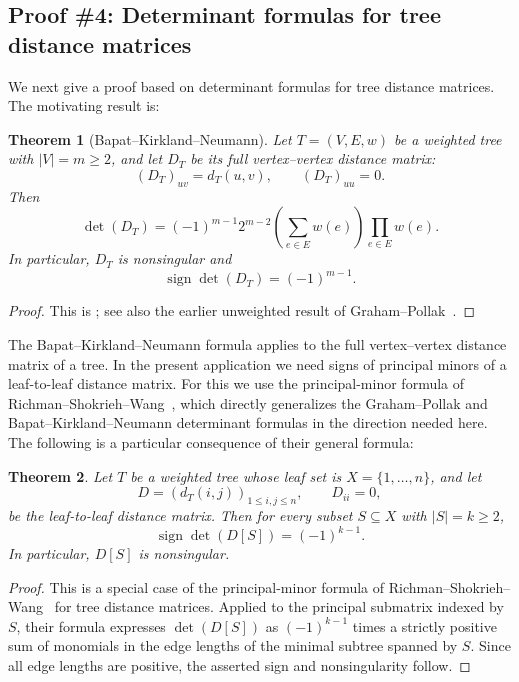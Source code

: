 \documentclass[12pt]{amsart}
\newtheorem{theorem}{Theorem}[section]
\theoremstyle{definition}
\newcommand{\1}{\mathbf{1}}
\begin{document}
\subsection{Proof \#4: Determinant formulas for tree distance matrices}
\label{app:determinant-proof}

We next give a proof based on determinant formulas for tree distance matrices.
The motivating result is:

\begin{theorem}[Bapat--Kirkland--Neumann]
\label{thm:BKN-distance-determinant}
Let $T=(V,E,w)$ be a weighted tree with $|V|=m\ge 2$, and let $D_T$ be its full
vertex--vertex distance matrix:
\[
(D_T)_{uv}=d_T(u,v),
\qquad
(D_T)_{uu}=0.
\]
Then
\[
\det(D_T)
=
(-1)^{m-1}2^{m-2}
\left(\sum_{e\in E}w(e)\right)\prod_{e\in E}w(e).
\]
In particular, $D_T$ is nonsingular and
\[
\operatorname{sign}\det(D_T)=(-1)^{m-1}.
\]
\end{theorem}

\begin{proof}
This is \cite[Corollary 2.5]{BKN05}; see also the earlier unweighted result of
Graham--Pollak~\cite{GP71}.
\end{proof}

The Bapat--Kirkland--Neumann formula applies to the full vertex--vertex distance
matrix of a tree.  In the present application we need signs of principal minors of a
leaf-to-leaf distance matrix.  For this we use the principal-minor formula of
Richman--Shokrieh--Wang~\cite{RSW24}, which directly generalizes the
Graham--Pollak and Bapat--Kirkland--Neumann determinant formulas in the direction
needed here. The following is a particular consequence of their general formula:

\begin{theorem}
\label{thm:tree-leaf-principal-minors}
Let $T$ be a weighted tree whose leaf set is $X=\{1,\dots,n\}$, and let
\[
D=(d_T(i,j))_{1\le i,j\le n},
\qquad
D_{ii}=0,
\]
be the leaf-to-leaf distance matrix.  Then for every subset $S\subseteq X$ with
$|S|=k\ge 2$,
\[
\operatorname{sign}\det(D[S])=(-1)^{k-1}.
\]
In particular, $D[S]$ is nonsingular.
\end{theorem}

\begin{proof}
This is a special case of the principal-minor formula of
Richman--Shokrieh--Wang~\cite{RSW24} for tree distance matrices.  Applied to the
principal submatrix indexed by $S$, their formula expresses $\det(D[S])$ as
$(-1)^{k-1}$ times a strictly positive sum of monomials in the edge lengths of the minimal subtree
spanned by $S$.  Since all edge lengths are positive, the asserted sign and
nonsingularity follow.
\end{proof}
\end{document}
